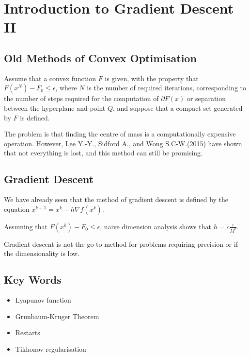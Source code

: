 \documentclass[11pt]{scrartcl}
\begin{document}
  \section{Introduction to Gradient Descent II}

  \subsection{Old Methods of Convex Optimisation}
  
  Assume that a convex function $F$ is given, with the property that
  $F(x^{N}) - F_{0} \leq \epsilon$, where $N$ is the number of
  required iterations, corresponding to the number of steps required
  for the computation of $\partial F(x)$ or separation between the
  hyperplane and point $Q$, and suppose that a compact set generated
  by $F$ is defined.

  The problem is that finding the centre of mass is a computationally
  expensive operation. However, Lee Y.-Y., Sidford A., and Wong
  S.C-W.(2015) have shown that not everything is lost, and this method
  can still be promising.

  \subsection{Gradient Descent}

  We have already seen that the method of gradient descent is defined
  by the equation $x^{k+1} = x^{k} - h \nabla f(x^{k})$.

  Assuming that $F(x^{k}) - F_{0} \leq \epsilon$, naive dimension
  analysis shows that $h = c \frac{\epsilon}{M^{2}}$.

  Gradient descent is not the go-to method for problems requiring
  precision or if the dimensionality is low.
    
  \subsection{Key Words}
  \begin{itemize}
  \item Lyapunov function
  \item Grunbaum-Kruger Theorem
  \item Restarts
  \item Tikhonov regularisation
  \end{itemize}
  

  
\end{document}

